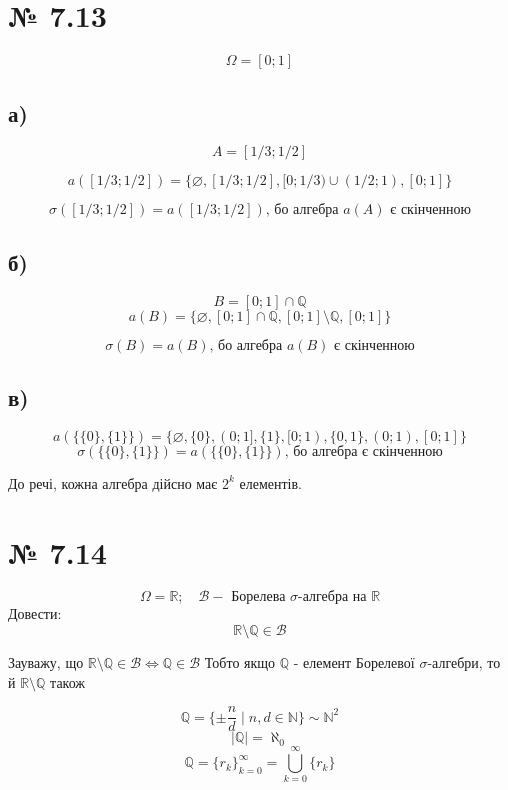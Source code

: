 \documentclass[11pt, a4paper]{article} %
\begin{document}
\section*{№ 7.13}
$$\Omega = [0; 1]$$
\subsection*{а)}
$$A = [1/3; 1/2]$$

$$
a([1/3; 1/2]) = \{\varnothing, [1/3; 1/2], [0;1/3)\cup (1/2; 1), [0;1]\}
$$

$$\sigma([1/3;1/2]) = a([1/3; 1/2]) \text{, бо алгебра $a(A)$ є скінченною}$$

\subsection*{б)}
$$B =  [0;1] \cap \mathbb{Q}$$
$$a(B) = \{\varnothing,   [0;1] \cap \mathbb{Q},  [0;1] \setminus \mathbb{Q}, [0;1]\}$$

$$\sigma(B) = a(B) \text{, бо алгебра $a(B)$ є скінченною}$$

\subsection*{в)}
$$a(\{\{0\}, \{1\}\}) = \{\varnothing, \{0\}, (0;1], \{1\}, [0;1), \{0,1\}, (0;1), [0;1]\}$$
$$\sigma(\{\{0\}, \{1\}\}) = a(\{\{0\}, \{1\}\}) \text{, бо алгебра є скінченною}$$

\begin{mdframed}
    До речі, кожна алгебра дійсно має $2^k$ елементів.
\end{mdframed}

\section*{№ 7.14}
\begin{mdframed}
    $$\Omega = \mathbb{R};\quad \mathcal{B} - \text{ Борелева $\sigma$-алгебра на } \mathbb{R}$$
    Довести: $$\mathbb{R} \setminus \mathbb{Q} \in \mathcal{B}$$
\end{mdframed}

Зауважу, що $\mathbb{R} \setminus \mathbb{Q} \in \mathcal{B} \iff \mathbb{Q} \in \mathcal{B}$
Тобто якщо $\mathbb{Q}$ - елемент Борелевої $\sigma$-алгебри, то й $\mathbb{R} \setminus \mathbb{Q}$ також

$$\mathbb{Q} = \{\pm \frac{n}{d}\;|\; n,d \in \mathbb{N}\} \sim \mathbb{N}^2$$
$$|\mathbb{Q}| = \aleph_0$$
$$\mathbb{Q} = \left.\{r_k\}\right._{k=0}^\infty = \bigcup_{k=0}^\infty \{r_k\}$$
\end{document}
